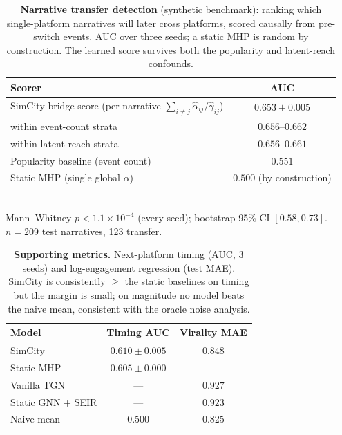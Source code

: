 \documentclass[11pt]{article}
\begin{document}
\begin{table}[t]
\centering
\small
\caption{\textbf{Narrative transfer detection} (synthetic benchmark): ranking
which single-platform narratives will later cross platforms, scored causally
from pre-switch events. AUC over three seeds; a static MHP is random by
construction. The learned score survives both the popularity and latent-reach
confounds.}
\label{tab:transfer}
\begin{tabular}{lc}
\toprule
\textbf{Scorer} & \textbf{AUC} \\
\midrule
SimCity bridge score (per-narrative $\sum_{i\neq j}\hat\alpha_{ij}/\hat\gamma_{ij}$)
  & $\mathbf{0.653 \pm 0.005}$ \\
\quad within event-count strata & $0.656$--$0.662$ \\
\quad within latent-reach strata & $0.656$--$0.661$ \\
Popularity baseline (event count) & $0.551$ \\
Static MHP (single global $\alpha$) & $0.500$ (by construction) \\
\bottomrule
\end{tabular}
\\[2pt]
\footnotesize Mann--Whitney $p < 1.1\times10^{-4}$ (every seed); bootstrap 95\%
CI $[0.58, 0.73]$. $n=209$ test narratives, 123 transfer.
\end{table}

\begin{table}[t]
\centering
\small
\caption{\textbf{Supporting metrics.} Next-platform timing (AUC, 3 seeds) and
log-engagement regression (test MAE). SimCity is consistently $\ge$ the static
baselines on timing but the margin is small; on magnitude no model beats the
naive mean, consistent with the oracle noise analysis.}
\label{tab:supporting}
\begin{tabular}{lcc}
\toprule
\textbf{Model} & \textbf{Timing AUC} & \textbf{Virality MAE} \\
\midrule
SimCity              & $\mathbf{0.610 \pm 0.005}$ & $0.848$ \\
Static MHP           & $0.605 \pm 0.000$          & --- \\
Vanilla TGN          & ---                        & $0.927$ \\
Static GNN + SEIR    & ---                        & $0.923$ \\
Naive mean           & $0.500$                    & $\mathbf{0.825}$ \\
\bottomrule
\end{tabular}
\end{table}
\end{document}
